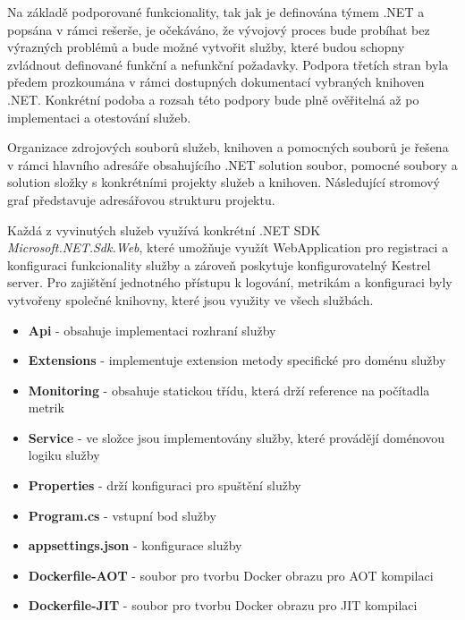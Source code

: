 
Na základě podporované funkcionality, tak jak je definována týmem .NET a popsána v rámci rešerše, je očekáváno, že vývojový proces bude probíhat bez výrazných problémů a bude možné vytvořit služby, které budou schopny zvládnout definované funkční a nefunkční požadavky. Podpora třetích stran byla předem prozkoumána v rámci dostupných dokumentací vybraných knihoven .NET. Konkrétní podoba a rozsah této podpory bude plně ověřitelná až po implementaci a otestování služeb.


Organizace zdrojových souborů služeb, knihoven a pomocných souborů je řešena v rámci hlavního adresáře obsahujícího .NET solution soubor, pomocné soubory a solution složky s konkrétními projekty služeb a knihoven. Následující
stromový graf představuje adresářovou strukturu projektu.


Každá z vyvinutých služeb využívá konkrétní .NET SDK \emph{Microsoft.NET.Sdk.Web}, které umožňuje využít WebApplication pro registraci a konfiguraci funkcionality služby a zároveň poskytuje konfigurovatelný Kestrel server. Pro zajištění jednotného přístupu k logování, metrikám a konfiguraci byly vytvořeny společné knihovny, které jsou využity ve všech službách.


\begin{itemize}
  \item \textbf{Api} - obsahuje implementaci rozhraní služby
  \item \textbf{Extensions} - implementuje extension metody specifické pro doménu služby
  \item \textbf{Monitoring} - obsahuje statickou třídu, která drží reference na počítadla metrik
  \item \textbf{Service} - ve složce jsou implementovány služby, které provádějí doménovou logiku služby
  \item \textbf{Properties} - drží konfiguraci pro spuštění služby
  \item \textbf{Program.cs} - vstupní bod služby
  \item \textbf{appsettings.json} - konfigurace služby
  \item \textbf{Dockerfile-AOT} - soubor pro tvorbu Docker obrazu pro AOT kompilaci
  \item \textbf{Dockerfile-JIT} - soubor pro tvorbu Docker obrazu pro JIT kompilaci
\end{itemize}

